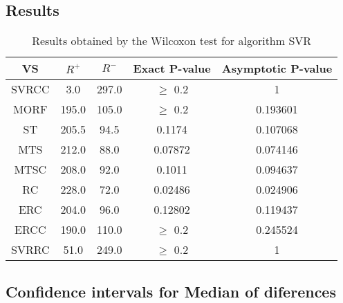 \documentclass[a4paper,10pt]{article}
\begin{document}
\subsection{Results}

\begin{table}[!htp]
\centering\small
\begin{tabular}{
|c|c|c|c|c|}
\hline
 VS & $R^{+}$ & $R^{-}$ & Exact P-value & Asymptotic P-value \\ \hline 
SVRCC & 3.0 & 297.0 & $\geq$ 0.2 & 1\\ \hline 
MORF & 195.0 & 105.0 & $\geq$ 0.2 & 0.193601\\ \hline 
ST & 205.5 & 94.5 & 0.1174 & 0.107068\\ \hline 
MTS & 212.0 & 88.0 & 0.07872 & 0.074146\\ \hline 
MTSC & 208.0 & 92.0 & 0.1011 & 0.094637\\ \hline 
RC & 228.0 & 72.0 & 0.02486 & 0.024906\\ \hline 
ERC & 204.0 & 96.0 & 0.12802 & 0.119437\\ \hline 
ERCC & 190.0 & 110.0 & $\geq$ 0.2 & 0.245524\\ \hline 
SVRRC & 51.0 & 249.0 & $\geq$ 0.2 & 1\\ \hline 

\end{tabular}
\caption{Results obtained by the Wilcoxon test for algorithm SVR}
\end{table}

\subsection{Confidence intervals for Median of diferences}
\end{document}

